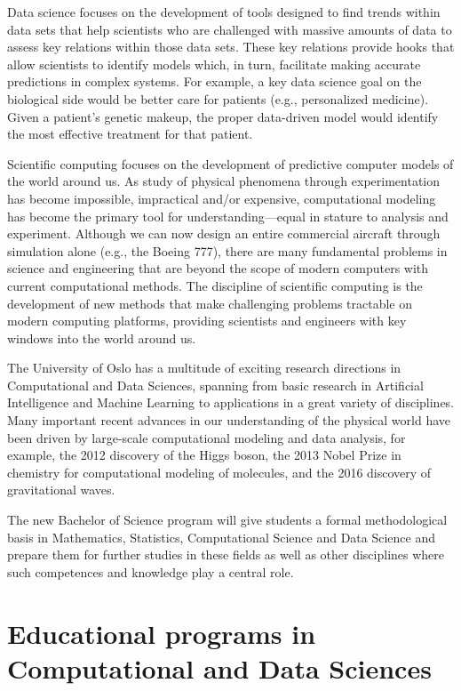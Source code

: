 \documentclass[oneside,final,10pt]{article}
\begin{document}
Data science focuses on the development of tools designed to find trends within data sets that help scientists who are challenged with massive amounts of data to assess key relations within those data sets. These key relations provide hooks that allow scientists to identify models which, in turn, facilitate making accurate predictions in complex systems. For example, a key data science goal on the biological side would be better care for patients (e.g., personalized medicine). Given a patient’s genetic makeup, the proper data-driven model would identify the most effective treatment for that patient. 

Scientific computing focuses on the development of predictive computer models of the world around us. As study of physical phenomena through experimentation has become impossible, impractical and/or expensive, computational modeling has become the primary tool for understanding—equal in stature to analysis and experiment. Although we can now design an entire commercial aircraft through simulation alone (e.g., the Boeing 777), there are many fundamental problems in science and engineering that are beyond the scope of modern computers with current computational methods. The discipline of scientific computing is the development of new methods that make challenging problems tractable on modern computing platforms, providing scientists and engineers with key windows into the world around us.

The University of Oslo has a multitude of exciting research directions in Computational and Data Sciences, spanning from basic research in Artificial Intelligence and Machine Learning to applications in a great variety of disciplines. Many important recent advances in our understanding of the physical world have been driven by large-scale computational modeling and data analysis, for example, the 2012 discovery of the Higgs boson, the 2013 Nobel Prize in chemistry for computational modeling of molecules, and the 2016 discovery of gravitational waves.

The new Bachelor of Science program will give students a formal methodological basis in Mathematics, Statistics, Computational Science and Data Science and prepare them for further studies in these fields as well as other disciplines where such competences and knowledge play a central role. 



\section*{Educational programs in Computational and Data Sciences}
\end{document}
